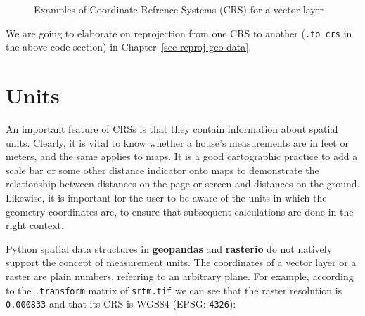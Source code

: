 \documentclass[
  letterpaper,
]{krantz}
\begin{document}
\begin{figure}

\begin{minipage}{0.50\linewidth}



\end{minipage}%
%
\begin{minipage}{0.50\linewidth}



\end{minipage}%

\caption{\label{fig-zion-crs}Examples of Coordinate Refrence Systems
(CRS) for a vector layer}

\end{figure}%

We are going to elaborate on reprojection from one CRS to another
(\texttt{.to\_crs} in the above code section) in
Chapter~\ref{sec-reproj-geo-data}.

\section{Units}\label{units}

An important feature of CRSs is that they contain information about
spatial units. Clearly, it is vital to know whether a house's
measurements are in feet or meters, and the same applies to maps. It is
a good cartographic practice to add a scale bar or some other distance
indicator onto maps to demonstrate the relationship between distances on
the page or screen and distances on the ground. Likewise, it is
important for the user to be aware of the units in which the geometry
coordinates are, to ensure that subsequent calculations are done in the
right context.

Python spatial data structures in \textbf{geopandas} and
\textbf{rasterio} do not natively support the concept of measurement
units. The coordinates of a vector layer or a raster are plain numbers,
referring to an arbitrary plane. For example, according to the
\texttt{.transform} matrix of \texttt{srtm.tif} we can see that the
raster resolution is \texttt{0.000833} and that its CRS is WGS84 (EPSG:
\texttt{4326}):
\end{document}
